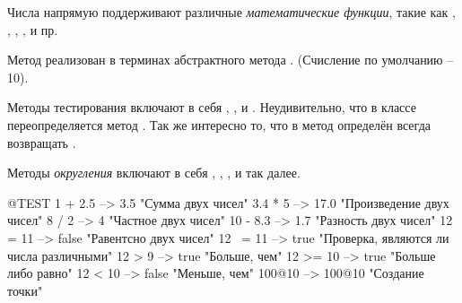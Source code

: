 \documentclass[a4paper,10pt,twoside]{book}
\begin{document}
Числа напрямую поддерживают различные \emph{математические функции}, такие как , , , ,  и пр.

Метод  реализован в терминах абстрактного метода . (Счисление по умолчанию -- 10).

Методы тестирования включают в себя , ,  и . Неудивительно, что в классе  переопределяется метод . Так же интересно то, что в метод  определён всегда возвращать .

Методы \emph{округления} включают в себя , , ,  и так далее.


\begin{code}{@TEST}
1 + 2.5     --> 3.5             "Сумма двух чисел"
3.4 * 5      --> 17.0           "Произведение двух чисел"
8 / 2         --> 4                 "Частное двух чисел"
10 - 8.3   --> 1.7              "Разность двух чисел"
12 = 11    --> false           "Равентсно двух чисел"
12 ~= 11 --> true            "Проверка, являются ли числа различными"
12 > 9      --> true            "Больше, чем"
12 >= 10  --> true            "Больше либо равно"
12 < 10    --> false           "Меньше, чем"
100@10   --> 100@10    "Создание точки"
\end{code}
\end{document}
